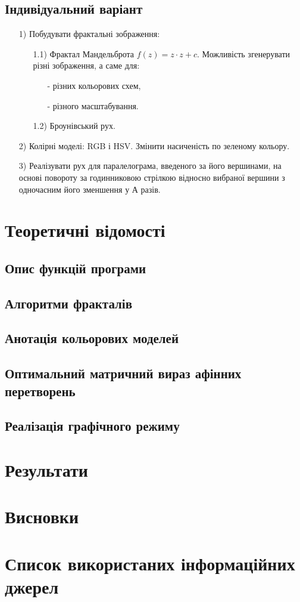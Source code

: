 \documentclass[oneside,14pt]{extarticle}
\begin{document}
\begin{normalsize}
	\subsection{Індивідуальний варіант}
	\begin{enumerate}
		\item[1)] Побудувати фрактальні зображення: \begin{enumerate}
			\item[1.1)] Фрактал Мандельброта $f(z)=z\cdot z+c$. Можливість згенерувати різні
			зображення, а саме для: \begin{enumerate}
				\item[-] різних кольорових схем,
				\item[-] різного масштабування.
			\end{enumerate}
			\item[1.2)] Броунівський рух.
		\end{enumerate}
		\item[2)] Колірні моделі: RGB і HSV. Змінити насиченість по зеленому кольору.
		\item[3)] Реалізувати рух для паралелограма, введеного за його вершинами, на основі
		повороту за годинниковою стрілкою відносно вибраної вершини з одночасним його
		зменшення у А разів.
	\end{enumerate}

	\section{Теоретичні відомості}
	\subsection{Опис функцій програми}
	\subsection{Алгоритми фракталів}
	\subsection{Анотація кольорових моделей}
	\subsection{Оптимальний матричний вираз афінних перетворень}
	\subsection{Реалізація графічного режиму}
	
	\section{Результати}

	\section{Висновки}
	   
	 \section{Список використаних інформаційних джерел}
\end{normalsize}
\end{document}
